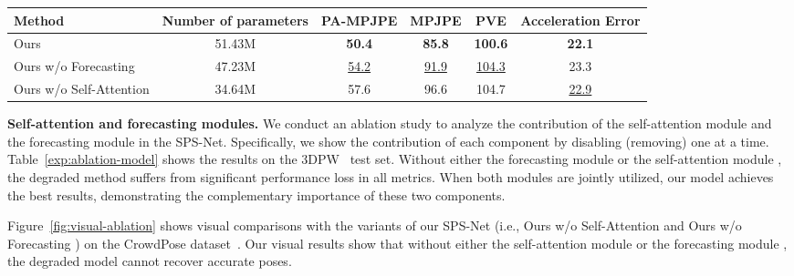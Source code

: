 \documentclass[times,referee,twocolumn,final,authoryear]{elsarticle}
\newcommand{\first}[1]{{\color{blue}\textbf{#1}}}
\newcommand{\second}[1]{{\color{red}\underline{#1}}}
\newcommand{\revised}[1]{{{#1}}}
\newcommand{\heading}[1]{\noindent\textbf{#1}}
\begin{document}
\begin{table*}[t]
  \caption{
\textbf{Ablation study on the self-attention and forecasting modules.}
We report the experimental results on the 3DPW~\citep{3DPW} test set.
The \first{bold} and \second{underlined} numbers indicate the top two results, respectively.
  }
  \vspace{-6.0mm}
  \begin{center}
    \scriptsize
    \label{exp:ablation-model}
{
    \begin{tabular}{lccccc}
\toprule
Method & \revised{Number of parameters} & PA-MPJPE  & MPJPE  & PVE  & \revised{Acceleration Error } \\
\midrule
Ours & 51.43M & \first{50.4} & \first{85.8} & \first{100.6} & \first{22.1} \\ 
Ours w/o Forecasting  & 47.23M & \second{54.2} & \second{91.9} & \second{104.3} & 23.3 \\
Ours w/o Self-Attention  & 34.64M & 57.6 & 96.6 & 104.7 & \second{22.9} \\ 
\bottomrule
\end{tabular}
    }
  \end{center}
  \vspace{-8.0mm}
\end{table*}

\heading{Self-attention and forecasting modules.}
We conduct an ablation study to analyze the contribution of the self-attention module  and the forecasting module  in the SPS-Net.
Specifically, we show the contribution of each component by disabling (removing) one at a time.
Table~\ref{exp:ablation-model} shows the results on the 3DPW~\citep{3DPW} test set.
Without either the forecasting module  or the self-attention module , the degraded method suffers from significant performance loss in all metrics.
When both modules are jointly utilized, our model achieves the best results, demonstrating the complementary importance of these two components.

\revised{
Figure~\ref{fig:visual-ablation} shows visual comparisons with the variants of our SPS-Net (i.e., Ours w/o Self-Attention  and Ours w/o Forecasting ) on the CrowdPose dataset~\citep{li2019crowdpose}.
Our visual results show that without either the self-attention module  or the forecasting module , the degraded model cannot recover accurate poses.
}
\end{document}
